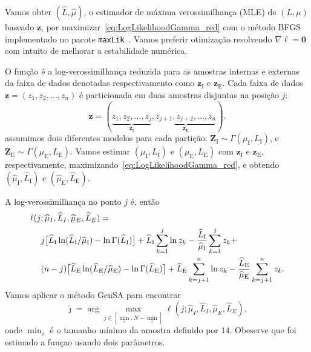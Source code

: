 Vamos obter $(\widehat L, \widehat \mu)$, o estimador de máxima verossimilhança (MLE) de $(L, \mu)$ baseado $\bm z$, por maximizar~\eqref{eq:LogLikelihoodGamma_red} com o método BFGS implementado no pacote \texttt{maxLik}~\citep{ht}. Vamos preferir otimização resolvendo $\nabla\ell=\bm 0$ com intuito de melhorar a estabilidade numérica.

O função é a log-verossimilhança reduzida para as amostras internas e externas da faixa de dados denotadas respectivamento como $\bm z_\text{I}$ e $\bm z_\text{E}$. Cada faixa de dados $\bm z = (z_1,z_2,\dots,z_n)$ é particionada em duas amostras disjuntas na posição $j$:  
$$
\bm z = (\underbrace{z_1,z_2,\dots,z_j}_{\bm z_\text{I}}, 
\underbrace{z_{j+1}, z_{j+2},\dots,z_n}_{\bm z_\text{E}}).
$$
assumimos dois diferentes modelos para cada partição:
$\bm Z_\text{I} \sim \Gamma(\mu_\text{I},L_\text{I})$, e
$\bm Z_\text{E} \sim \Gamma(\mu_\text{E},L_\text{E})$.
Vamos estimar $(\mu_\text{I},L_\text{I})$ e $(\mu_\text{E},L_\text{E})$ com $\bm z_\text{I}$ e $\bm z_\text{E}$, respectivamente, maximizando~\eqref{eq:LogLikelihoodGamma_red}, e obtendo $(\widehat{\mu}_\text{I}, \widehat{L}_\text{I})$ e $(\widehat{\mu}_\text{E}, \widehat{L}_\text{E})$.


A log-verossimilhança no ponto $j$ é, então
\begin{equation}\label{eq:TotalLogLikelihood}
\begin{split}
\ell(j&;\widehat{\mu}_I, \widehat{L}_I,\widehat{\mu}_E, \widehat{L}_E)=\\
&j \big[\widehat{L}_\text{I}\ln (\widehat{L}_\text{I} / \widehat{\mu}_\text{I}) - \ln \Gamma(\widehat{L}_\text{I})\big]
+\widehat{L}_\text{I} \sum_{k=1}^{j}\ln z_k -\frac{\widehat{L}_\text{I}}{\widehat{\mu}_\text{I}}\sum_{k=1}^{j} z_k +\\
&(n-j) \big[\widehat{L}_\text{E}\ln (\widehat{L}_\text{E} / \widehat{\mu}_\text{E}) - \ln \Gamma(\widehat{L}_\text{E})\big]
+\widehat{L}_\text{E} \sum_{k=j+1}^{n}\ln z_k - \frac{\widehat{L}_\text{E}}{\widehat{\mu}_\text{E}}\sum_{k=j+1}^{n} z_k.
\raisetag{2.2em}
\end{split}
\end{equation}
Vamos aplicar o método GenSA para encontrar
$$
\widehat{\jmath}= \arg\max\limits_{j\in [\min_s,N-\min_s]}\ell(j;\widehat{\mu}_I, \widehat{L}_I,\widehat{\mu}_E, \widehat{L}_E),
$$ 
onde $\min_s$ é o tamanho mínimo da amostra definido por $14$. Obeserve que foi estimado a funçao usando dois parâmetros. 

